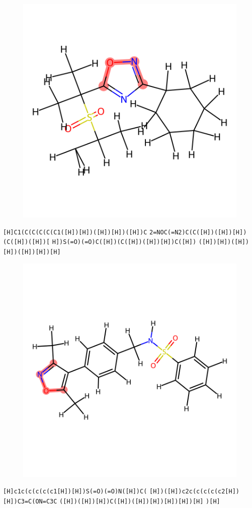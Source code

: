 \documentclass{article}
\begin{document}
\begin{figure}[ht]
\centering
    \includegraphics{mol64.png}
\end{figure}
\verb|[H]C1(C(C(C(C(C1([H])[H])([H])[H])([H])C| \verb|2=NOC(=N2)C(C([H])([H])[H])(C([H])([H])[| \verb|H])S(=O)(=O)C([H])(C([H])([H])[H])C([H])| \verb|([H])[H])([H])[H])([H])[H])[H]|

\begin{figure}[ht]
\centering
    \includegraphics{mol65.png}
\end{figure}
\verb|[H]c1c(c(c(c(c1[H])[H])S(=O)(=O)N([H])C(| \verb|[H])([H])c2c(c(c(c(c2[H])[H])C3=C(ON=C3C| \verb|([H])([H])[H])C([H])([H])[H])[H])[H])[H]| \verb|)[H]|
\end{document}
